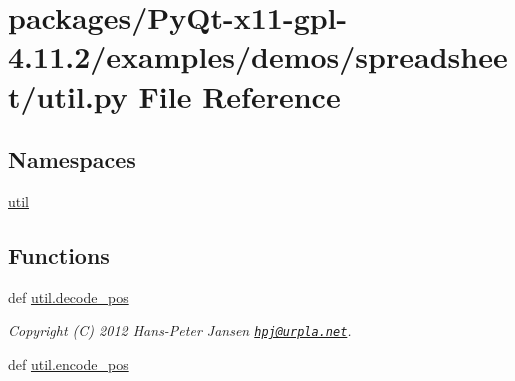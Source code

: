 \hypertarget{PyQt-x11-gpl-4_811_82_2examples_2demos_2spreadsheet_2util_8py}{}\section{packages/\+Py\+Qt-\/x11-\/gpl-\/4.11.2/examples/demos/spreadsheet/util.py File Reference}
\label{PyQt-x11-gpl-4_811_82_2examples_2demos_2spreadsheet_2util_8py}
\subsection*{Namespaces}
\begin{DoxyCompactItemize}
\item 
 \hyperlink{namespaceutil}{util}
\end{DoxyCompactItemize}
\subsection*{Functions}
\begin{DoxyCompactItemize}
\item 
def \hyperlink{namespaceutil_ab7a9635a4b2fbf7ece7ce7e7b037ae56}{util.\+decode\+\_\+pos}
\begin{DoxyCompactList}\small\item\em Copyright (C) 2012 Hans-\/\+Peter Jansen \href{mailto:hpj@urpla.net}{\tt hpj@urpla.\+net}. \end{DoxyCompactList}\item 
def \hyperlink{namespaceutil_a04e1689b5422be690a42611bc9b682cf}{util.\+encode\+\_\+pos}
\end{DoxyCompactItemize}
